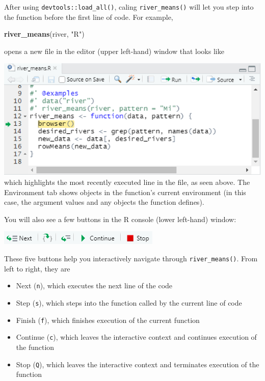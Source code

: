 \documentclass[
]{book}
\newenvironment{Shaded}{\begin{snugshade}}{\end{snugshade}}
\newcommand{\KeywordTok}[1]{\textcolor[rgb]{0.13,0.29,0.53}{\textbf{#1}}}
\newcommand{\NormalTok}[1]{#1}
\newcommand{\StringTok}[1]{\textcolor[rgb]{0.31,0.60,0.02}{#1}}
\providecommand{\tightlist}{%
  \setlength{\itemsep}{0pt}\setlength{\parskip}{0pt}}
\begin{document}
After using \texttt{devtools::load\_all()}, caling \texttt{river\_means()} will let you step into the function before the first line of code. For example,

\begin{Shaded}
\begin{Highlighting}[]
\KeywordTok{river_means}\NormalTok{(river, }\StringTok{"R"}\NormalTok{)}
\end{Highlighting}
\end{Shaded}

opens a new file in the editor (upper left-hand) window that looks like

\includegraphics[width=0.75\linewidth]{images/newrpack_files7_2}
which highlights the most recently executed line in the file, as seen above. The Environment tab shows objects in the function's current environment (in this case, the argument values and any objects the function defines).

You will also see a few buttons in the R console (lower left-hand) window:

\includegraphics[width=0.75\linewidth]{images/newrpack_files8}

These five buttons help you interactively navigate through \texttt{river\_means()}. From left to right, they are

\begin{itemize}
\tightlist
\item
  Next (\texttt{n}), which executes the next line of the code
\item
  Step (\texttt{s}), which steps into the function called by the current line of code
\item
  Finish (\texttt{f}), which finishes execution of the current function
\item
  Continue (\texttt{c}), which leaves the interactive context and continues execution of the function
\item
  Stop (\texttt{Q}), which leaves the interactive context and terminates execution of the function
\end{itemize}
\end{document}
